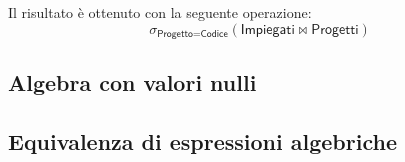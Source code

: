\documentclass[a4paper]{article}
\begin{document}
	\noindent
	Il risultato è ottenuto con la seguente operazione:
	\begin{equation*}
		\sigma_{\textsf{Progetto} = \textsf{Codice}}\left(\textsf{Impiegati} \Join \textsf{Progetti}\right)
	\end{equation*}



	\newpage
	\subsection{Algebra con valori nulli}
	
	\subsection{Equivalenza di espressioni algebriche}
\end{document}
